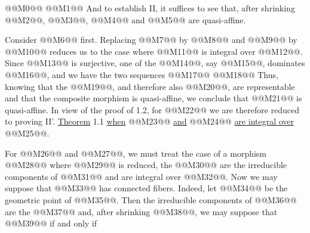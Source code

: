 @@M0@@
@@M1@@
And to establish II, it suffices to see that, after shrinking @@M2@@, @@M3@@, @@M4@@ and @@M5@@ are quasi-affine.

Consider @@M6@@ first. Replacing @@M7@@ by @@M8@@ and @@M9@@ by @@M10@@ reduces us to the case where @@M11@@ is integral over @@M12@@. Since @@M13@@ is surjective, one of the @@M14@@, say @@M15@@, dominates @@M16@@, and we have the two sequences
@@M17@@
@@M18@@
Thus, knowing that the @@M19@@, and therefore also @@M20@@, are representable and that the composite morphism is quasi-affine, we conclude that @@M21@@ is quasi-affine. In view of the proof of 1.2, for @@M22@@ we are therefore reduced to proving II'. \uline{Theorem} 1.1 \uline{when} @@M23@@ \uline{and} @@M24@@ \uline{are integral over} @@M25@@.

For @@M26@@ and @@M27@@, we must treat the case of a morphism @@M28@@ where @@M29@@ is reduced, the @@M30@@ are the irreducible components of @@M31@@ and are integral over @@M32@@. Now we may suppose that @@M33@@ has connected fibers. Indeed, let @@M34@@ be the geometric point of @@M35@@. Then the irreducible components of @@M36@@ are the @@M37@@ and, after shrinking @@M38@@, we may suppose that @@M39@@ if and only if

